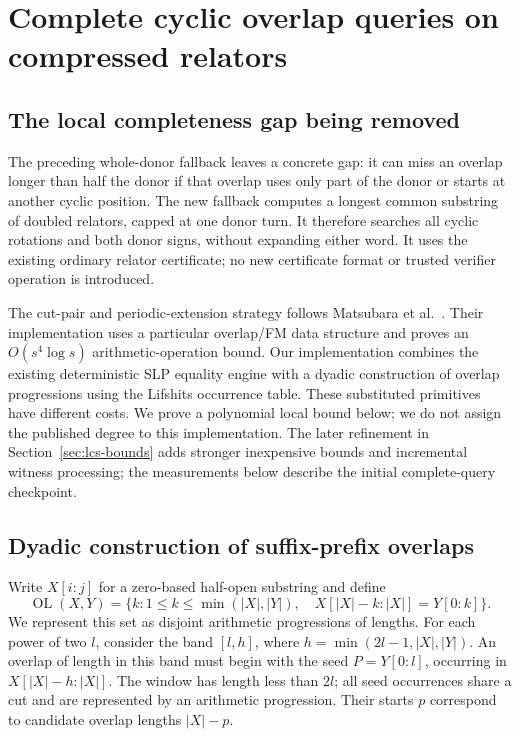 \section{Complete cyclic overlap queries on compressed relators}
\label{sec:compressed-lcs}

\subsection{The local completeness gap being removed}

The preceding whole-donor fallback leaves a concrete gap: it can miss an
overlap longer than half the donor if that overlap uses only part of the
donor or starts at another cyclic position. The new fallback computes a
longest common substring of doubled relators, capped at one donor turn.
It therefore searches all cyclic rotations and both donor signs, without
expanding either word. It uses the existing ordinary relator certificate;
no new certificate format or trusted verifier operation is introduced.

The cut-pair and periodic-extension strategy follows Matsubara et
al.~\cite{matsubara-compressed-lcs}. Their implementation uses a particular
overlap/FM data structure and proves an $O(s^4\log s)$ arithmetic-operation
bound. Our implementation combines the existing deterministic SLP equality
engine with a dyadic construction of overlap progressions using the
Lifshits occurrence table. These substituted primitives have different
costs. We prove a polynomial local bound below; we do not assign the
published degree to this implementation. The later refinement in
Section~\ref{sec:lcs-bounds} adds stronger inexpensive bounds and
incremental witness processing; the measurements below describe the
initial complete-query checkpoint.

\subsection{Dyadic construction of suffix-prefix overlaps}

Write $X[i:j]$ for a zero-based half-open substring and define
\[
 \operatorname{OL}(X,Y)=
 \{k:1\le k\le\min(|X|,|Y|),\quad X[|X|-k:|X|]=Y[0:k]\}.
\]
We represent this set as disjoint arithmetic progressions of lengths.
For each power of two $l$, consider the band
$[l,h]$, where $h=\min(2l-1,|X|,|Y|)$. An overlap of length in this band
must begin with the seed $P=Y[0:l]$, occurring in
$X[|X|-h:|X|]$. The window has length less than $2l$; all seed occurrences
share a cut and are represented by an arithmetic progression. Their starts
$p$ correspond to candidate overlap lengths $|X|-p$.

